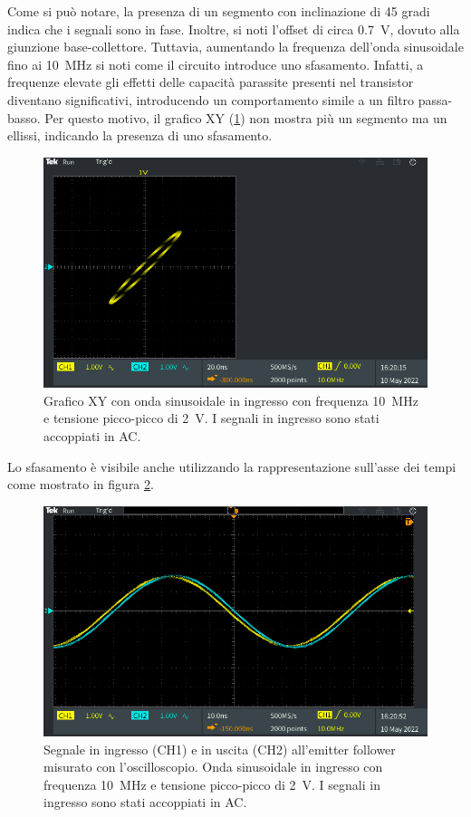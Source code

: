 Come si può notare, la presenza di un segmento con inclinazione di 45 gradi indica che i segnali sono in fase. Inoltre, si noti l'offset di circa \SI{0.7}{\volt}, dovuto alla giunzione base-collettore. 
Tuttavia, aumentando la frequenza dell'onda sinusoidale fino ai \SI{10}{\mega\hertz} si noti come il circuito introduce uno sfasamento. Infatti, a frequenze elevate gli effetti delle capacità parassite presenti nel transistor diventano significativi, introducendo un comportamento simile a un filtro passa-basso. Per questo motivo, il grafico XY (\Fig\ref{fig:emitterfollwer_XY_2}) non mostra più un segmento ma un ellissi, indicando la presenza di uno sfasamento. 
\begin{figure}[h!]
	\centering
	\includegraphics[width=0.7\linewidth]{./ImageFiles/Laboratorio 1/TEK00006}
	\caption{Grafico XY con onda sinusoidale in ingresso con frequenza \SI{10}{\mega\hertz} e tensione picco-picco di \SI{2}{\volt}. I segnali in ingresso sono stati accoppiati in AC.}
	\label{fig:emitterfollwer_XY_2}
\end{figure}
Lo sfasamento è visibile anche utilizzando la rappresentazione sull'asse dei tempi come mostrato in figura \ref{fig:emitterfollwer_oscilloscopio_2}.
\begin{figure}[h!]
	\centering
	\includegraphics[width=0.7\linewidth]{./ImageFiles/Laboratorio 1/TEK00007}
	\caption{Segnale in ingresso (CH1) e in uscita (CH2) all'emitter follower misurato con l'oscilloscopio. Onda sinusoidale in ingresso con frequenza \SI{10}{\mega\hertz} e tensione picco-picco di \SI{2}{\volt}. I segnali in ingresso sono stati accoppiati in AC.}
	\label{fig:emitterfollwer_oscilloscopio_2}
\end{figure}

